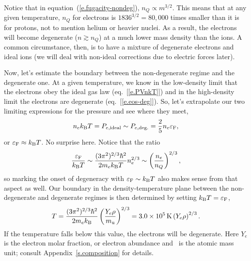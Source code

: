 Notice that in equation~(\ref{e.fugacity-nondeg}), $n_{Q}\propto m^{3/2}$.  This means that at any given temperature, $n_{Q}$ for electrons is $1836^{3/2} = 80,000$ times smaller than it is for protons, not to mention helium or heavier nuclei. As a result, the electrons will become degenerate ($n\gtrsim n_{Q}$) at a much lower mass density than the ions.    A common circumstance, then, is to have a mixture of degenerate electrons and ideal ions (we will deal with non-ideal corrections due to electric forces later).  

Now, let's estimate the boundary between the non-degenerate regime and the degenerate one. At a given temperature, we know in the low-density limit that the electrons obey the ideal gas law (eq.~[\ref{e.PVnkT}]) and in the high-density limit the electrons are degenerate (eq.~[\ref{e.eos-deg}]). So, let's extrapolate our two limiting expressions for the pressure and see where they meet,
\begin{equation}
n_{e}k_\mathrm{B} T = P_{e,\mathrm{ideal}} \sim P_{e,\mathrm{deg.}} 
  = \frac{2}{5}n_{e}\varepsilon_{\mathrm{F}},
\end{equation}
or $\varepsilon_{\mathrm{F}} \approx k_\mathrm{B} T$.  No surprise here.  Notice that the ratio
\begin{equation}
\frac{\varepsilon_{\mathrm{F}}}{k_\mathrm{B} T} \sim \frac{(3\pi^{2})^{2/3}\hbar^{2}}{2m_{e}k_\mathrm{B} T}n_{e}^{2/3} \sim \left(\frac{n_{e}}{n_{Q}}\right)^{2/3},
\end{equation}
so marking the onset of degeneracy with $\varepsilon_{\mathrm{F}}\sim k_\mathrm{B} T$ also makes sense from that aspect as well. Our boundary in the density-temperature plane between the non-degenerate and degenerate regimes is then determined by setting $k_\mathrm{B} T = \varepsilon_{\mathrm{F}}$,
\begin{equation}\label{e.TF}
T = \frac{(3\pi^{2})^{2/3}\hbar^{2}}{2m_{e}k_\mathrm{B} }\left(\frac{Y_{e}\rho}{m_\mathrm{u}}\right)^{2/3} = 3.0\times 10^{5}\,\mathrm{K} \left(Y_{e}\rho\right)^{2/3}.
\end{equation}
If the temperature falls below this value, the electrons will be degenerate. Here $Y_{e}$ is the electron molar fraction, or electron abundance and \mb\ is the atomic mass unit; consult Appendix~\ref{s.composition} for details.

